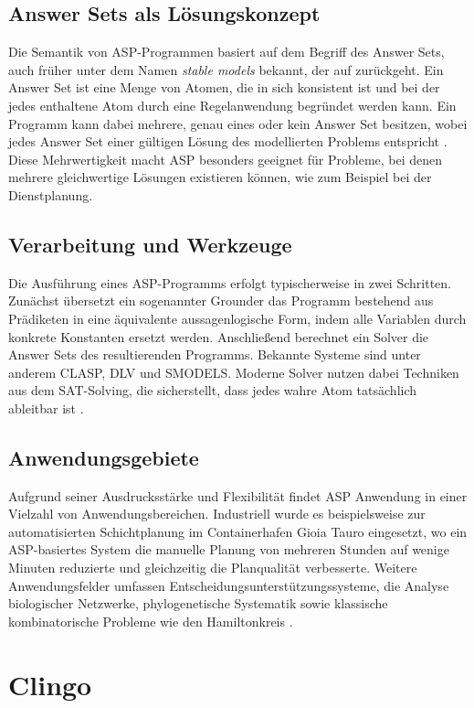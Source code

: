 \subsection{Answer Sets als Lösungskonzept}
Die Semantik von ASP-Programmen basiert auf dem Begriff des Answer Sets, auch früher unter dem Namen \textit{stable models} bekannt, der auf \cite{stableModelSemanticGelfond} zurückgeht. Ein Answer Set ist eine Menge von Atomen, die in sich konsistent ist und bei der jedes enthaltene Atom durch eine Regelanwendung begründet werden kann. Ein Programm kann dabei mehrere, genau eines oder kein Answer Set besitzen, wobei jedes Answer Set einer gültigen Lösung des modellierten Problems entspricht \parencite{brewkaAnswerSetProgramming2011}. Diese Mehrwertigkeit macht ASP besonders geeignet für Probleme, bei denen mehrere gleichwertige Lösungen existieren können, wie zum Beispiel bei der Dienstplanung.
\subsection{Verarbeitung und Werkzeuge}
Die Ausführung eines ASP-Programms erfolgt typischerweise in zwei Schritten. Zunächst übersetzt ein sogenannter Grounder das Programm bestehend aus Prädiketen in eine äquivalente aussagenlogische Form, indem alle Variablen durch konkrete Konstanten ersetzt werden. Anschließend berechnet ein Solver die Answer Sets des resultierenden Programms. Bekannte Systeme sind unter anderem CLASP, DLV und SMODELS. Moderne Solver nutzen dabei Techniken aus dem SAT-Solving, die sicherstellt, dass jedes wahre Atom tatsächlich ableitbar ist \parencite{brewkaAnswerSetProgramming2011}.
\subsection{Anwendungsgebiete}
Aufgrund seiner Ausdrucksstärke und Flexibilität findet ASP Anwendung in einer Vielzahl von Anwendungsbereichen. Industriell wurde es beispielsweise zur automatisierten Schichtplanung im Containerhafen Gioia Tauro eingesetzt, wo ein ASP-basiertes System die manuelle Planung von mehreren Stunden auf wenige Minuten reduzierte und gleichzeitig die Planqualität verbesserte. Weitere Anwendungsfelder umfassen Entscheidungsunterstützungssysteme, die Analyse biologischer Netzwerke, phylogenetische Systematik sowie klassische kombinatorische Probleme wie den Hamiltonkreis \parencite{brewkaAnswerSetProgramming2011}. 

\section{Clingo}

